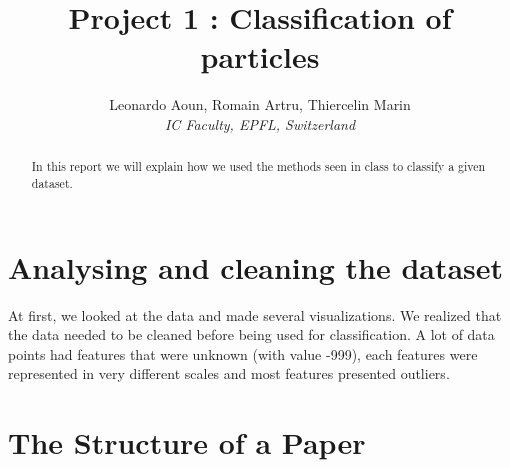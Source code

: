 \documentclass[10pt,conference,compsocconf]{IEEEtran}
\begin{document}
\title{Project 1 : Classification of particles}

\author{
    Leonardo Aoun,
    Romain Artru,
  Thiercelin Marin\\
  \textit{IC Faculty, EPFL, Switzerland}
}

\maketitle

\begin{abstract}
    In this report we will explain how we used the methods
    seen in class to classify a given dataset.
\end{abstract}

\section{Analysing and cleaning the dataset}
At first, we looked at the data and made several visualizations.
We realized that the data needed to be cleaned before
being used for classification. A lot of data points
had features that were unknown (with value -999),
each features were represented in very different scales
and most features presented outliers.



\section{The Structure of a Paper}
\label{sec:structure-paper}
\end{document}
